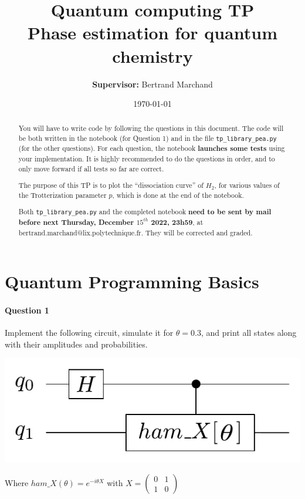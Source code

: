 \documentclass{article}
\title{Quantum computing TP\\ Phase estimation for quantum chemistry}
\author{\textbf{Supervisor:} Bertrand Marchand}
\date{\today}
\begin{document}
\maketitle
\begin{abstract}
You will have to write code by following the questions in this document.
The code will be both written in the notebook (for Question 1) and
in the file {\tt tp\_library\_pea.py} (for the other questions). For each question, the notebook
\textbf{launches some tests} using your implementation. It is 
highly recommended to do the questions in order, and to only
move forward if all tests so far are correct.

The purpose of this TP is to plot the ``dissociation curve'' of $H_2$,
for various values of the Trotterization parameter $p$, which
is done at the end of the notebook.

Both {\tt tp\_library\_pea.py} and the completed notebook \textbf{need to be sent by mail before next Thursday, December $15^{th}$ 2022, 23h59},
at bertrand.marchand@lix.polytechnique.fr. 
They will be corrected and graded.
\end{abstract}

\section{Quantum Programming Basics}

\paragraph{Question 1} Implement the following circuit, simulate it for $\theta=0.3$, and print all states along with their amplitudes and probabilities.

\begin{center}
\includegraphics[width=.7\textwidth]{qat2pdf_llce_fji_circ.pdf}
\end{center}

Where $ham\_X(\theta) = e^{-i\theta X}$ with $X=\begin{pmatrix}0 & 1 \\ 1 & 0\end{pmatrix}$
\end{document}
